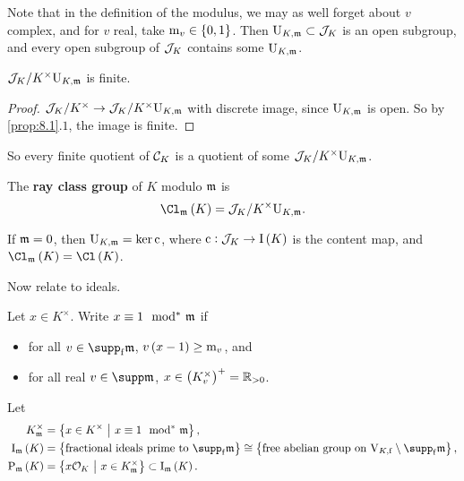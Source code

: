 Note that in the definition of the modulus, we may as well forget about $ v $ complex, and for $ v $ real, take $ \m_v \in \cbr{0, 1} $. Then $ \mathrm{U}_{K, \mathfrak{m}} \subset \mathcal{J}_K $ is an open subgroup, and every open subgroup of $ \mathcal{J}_K $ contains some $ \mathrm{U}_{K, \mathfrak{m}} $.

\begin{proposition}
$ \mathcal{J}_K / K^\times\mathrm{U}_{K, \mathfrak{m}} $ is finite.
\end{proposition}

\begin{proof}
$ \mathcal{J}_K / K^\times \to \mathcal{J}_K / K^\times\mathrm{U}_{K, \mathfrak{m}} $ with discrete image, since $ \mathrm{U}_{K, \mathfrak{m}} $ is open. So by \ref{prop:8.1}.$ 1 $, the image is finite.
\end{proof}

So every finite quotient of $ \mathcal{C}_K $ is a quotient of some $ \mathcal{J}_K / K^\times\mathrm{U}_{K, \mathfrak{m}} $.

\begin{definition*}
The \textbf{ray class group} of $ K $ modulo $ \mathfrak{m} $ is
$$ \Cl_\mmm\br{K} = \JJJ_K / K^\times\U_{K, \mmm}. $$
\end{definition*}

\begin{example*}
If $ \mathfrak{m} = 0 $, then $ \mathrm{U}_{K, \mathfrak{m}} = \ker \mathrm{c} $, where $ \c : \JJJ_K \to \I\br{K} $ is the content map, and $ \Cl_\mmm\br{K} = \Cl\br{K} $.
\end{example*}

Now relate to ideals.

\begin{notation*}
Let $ x \in K^\times $. Write $ x \equiv 1 \mod\!\!^*\  \mathfrak{m} $ if
\begin{itemize}
\item for all $ v \in \supp_\f \mmm $, $ v\br{x - 1} \ge \m_v $, and
\item for all real $ v \in \supp \mmm $, $ x \in \br{K_v^\times}^+ = \RR_{> 0} $.
\end{itemize}
Let
\begin{align*}
K_\mmm^\times & = \cbr{x \in K^\times \st x \equiv 1 \mods \mmm}, \\
\I_\mmm\br{K} & = \cbr{\text{fractional ideals prime to} \ \supp_\f \mmm} \cong \cbr{\text{free abelian group on} \ \V_{K, \f} \setminus \supp_\f \mmm}, \\
\P_\mmm\br{K} & = \cbr{x\OOO_K \st x \in K_\mmm^\times} \subset \I_\mmm\br{K}.
\end{align*}
\end{notation*}

